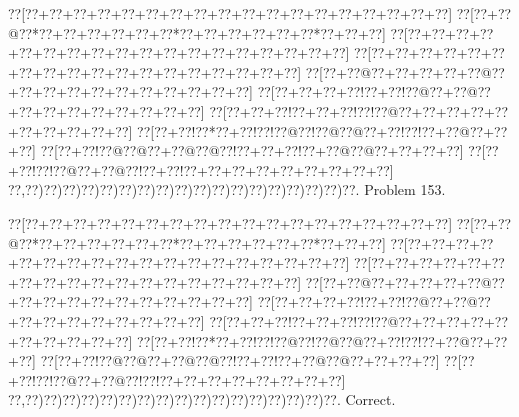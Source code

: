\documentclass[a5paper]{article}
\begin{document}
\begin{center}
{\goo
\0??[\0??+\0??+\0??+\0??+\0??+\0??+\0??+\0??+\0??+\0??+\0??+\0??+\0??+\0??+\0??+\0??+\0??+\0??]
\0??[\0??+\0??@\0??*\0??+\0??+\0??+\0??+\0??+\0??*\0??+\0??+\0??+\0??+\0??+\0??*\0??+\0??+\0??]
\0??[\0??+\0??+\0??+\0??+\0??+\0??+\0??+\0??+\0??+\0??+\0??+\0??+\0??+\0??+\0??+\0??+\0??+\0??]
\0??[\0??+\0??+\0??+\0??+\0??+\0??+\0??+\0??+\0??+\0??+\0??+\0??+\0??+\0??+\0??+\0??+\0??+\0??]
\0??[\0??+\0??@\0??+\0??+\0??+\0??+\0??@\0??+\0??+\0??+\0??+\0??+\0??+\0??+\0??+\0??+\0??+\0??]
\0??[\0??+\0??+\0??+\0??!\0??+\0??!\0??@\0??+\0??@\0??+\0??+\0??+\0??+\0??+\0??+\0??+\0??+\0??]
\0??[\0??+\0??+\0??!\0??+\0??+\0??!\0??!\0??@\0??+\0??+\0??+\0??+\0??+\0??+\0??+\0??+\0??+\0??]
\0??[\0??+\0??!\0??*\0??+\0??!\0??!\0??@\0??!\0??@\0??@\0??+\0??!\0??!\0??+\0??@\0??+\0??+\0??]
\0??[\0??+\0??!\0??@\0??@\0??+\0??@\0??@\0??!\0??+\0??+\0??!\0??+\0??@\0??@\0??+\0??+\0??+\0??]
\0??[\0??+\0??!\0??!\0??@\0??+\0??@\0??!\0??+\0??!\0??+\0??+\0??+\0??+\0??+\0??+\0??+\0??+\0??]
\0??,\0??)\0??)\0??)\0??)\0??)\0??)\0??)\0??)\0??)\0??)\0??)\0??)\0??)\0??)\0??)\0??)\0??)\0??.
}
Problem 153.

\end{center}
\begin{center}
{\goo
\0??[\0??+\0??+\0??+\0??+\0??+\0??+\0??+\0??+\0??+\0??+\0??+\0??+\0??+\0??+\0??+\0??+\0??+\0??]
\0??[\0??+\0??@\0??*\0??+\0??+\0??+\0??+\0??+\0??*\0??+\0??+\0??+\0??+\0??+\0??*\0??+\0??+\0??]
\0??[\0??+\0??+\0??+\0??+\0??+\0??+\0??+\0??+\0??+\0??+\0??+\0??+\0??+\0??+\0??+\0??+\0??+\0??]
\0??[\0??+\0??+\0??+\0??+\0??+\0??+\0??+\0??+\0??+\0??+\0??+\0??+\0??+\0??+\0??+\0??+\0??+\0??]
\0??[\0??+\0??@\0??+\0??+\0??+\0??+\0??@\0??+\0??+\0??+\0??+\0??+\0??+\0??+\0??+\0??+\0??+\0??]
\0??[\0??+\0??+\0??+\0??!\0??+\0??!\0??@\0??+\0??@\0??+\0??+\0??+\0??+\0??+\0??+\0??+\0??+\0??]
\0??[\0??+\0??+\0??!\0??+\0??+\0??!\0??!\0??@\0??+\0??+\0??+\0??+\0??+\0??+\0??+\0??+\0??+\0??]
\0??[\0??+\0??!\0??*\0??+\0??!\0??!\0??@\0??!\0??@\0??@\0??+\0??!\0??!\0??+\0??@\0??+\0??+\0??]
\0??[\0??+\0??!\0??@\0??@\0??+\0??@\0??@\0??!\0??+\0??!\0??+\0??@\0??@\0??+\0??+\0??+\0??]
\0??[\0??+\0??!\0??!\0??@\0??+\0??@\0??!\0??!\0??+\0??+\0??+\0??+\0??+\0??+\0??+\0??]
\0??,\0??)\0??)\0??)\0??)\0??)\0??)\0??)\0??)\0??)\0??)\0??)\0??)\0??)\0??)\0??)\0??)\0??.
}
Correct. 

\end{center}
\end{document}
